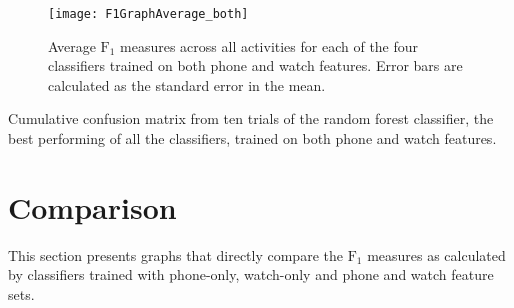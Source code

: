     \begin{figure}
      \centering
      \texttt{[image: F1GraphAverage\_both]}
      \caption[Average $\mathrm{F}_1$ measures across all activities for each of the four classifiers trained on both phone and watch features]{Average $\mathrm{F}_1$ measures across all activities for each of the four classifiers trained on both phone and watch features. Error bars are calculated as the standard error in the mean.}
      \label{fig:F1GraphAverage_both}
    \end{figure}
    
    \begin{table}
      \tabcolsep=0.11cm
      \centering
        
      \caption[Confusion matrix of the random forest classifier trained on both phone and watch features features]{Cumulative confusion matrix from ten trials of the random forest classifier, the best performing of all the classifiers, trained on both phone and watch features.}
      \label{tab:ConfusionMatrix_both_RandomForestClassifier}
    \end{table}
  
  \section{Comparison}
    This section presents graphs that directly compare the $\mathrm{F}_1$ measures as calculated by classifiers trained with phone-only, watch-only and phone and watch feature sets.
    
